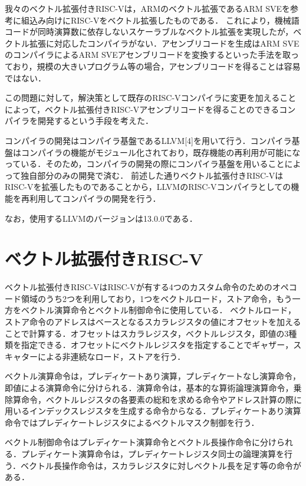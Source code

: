 \documentclass[a4paper,9pt, twocolumn]{jarticle}
\begin{document}
我々のベクトル拡張付きRISC-Vは，ARMのベクトル拡張であるARM SVE\cite{bib:arm_sve}を参考に組込み向けにRISC-V\cite{bib:risc-v}をベクトル拡張したものである．
これにより，機械語コードが同時演算数に依存しないスケーラブルなベクトル拡張を実現したが，ベクトル拡張に対応したコンパイラがない．アセンブリコードを生成はARM SVEのコンパイラによるARM SVEアセンブリコードを変換するといった手法を取っており，規模の大きいプログラム等の場合，アセンブリコードを得ることは容易ではない．

この問題に対して，解決策として既存のRISC-Vコンパイラに変更を加えることによって，ベクトル拡張付きRISC-Vアセンブリコードを得ることのできるコンパイラを開発するという手段を考えた．

コンパイラの開発はコンパイラ基盤であるLLVM[4]を用いて行う．コンパイラ基盤はコンパイラの機能がモジュール化されており，既存機能の再利用が可能になっている．そのため，コンパイラの開発の際にコンパイラ基盤を用いることによって独自部分のみの開発で済む．
前述した通りベクトル拡張付きRISC-VはRISC-Vを拡張したものであることから，LLVMのRISC-Vコンパイラとしての機能を再利用してコンパイラの開発を行う．

なお，使用するLLVMのバージョンは13.0.0である．

\section{ベクトル拡張付きRISC-V}

ベクトル拡張付きRISC-VはRISC-Vが有する4つのカスタム命令のためのオペコード領域のうち2つを利用しており，1つをベクトルロード，ストア命令，もう一方をベクトル演算命令とベクトル制御命令に使用している．
ベクトルロード，ストア命令のアドレスはベースとなるスカラレジスタの値にオフセットを加えることで計算する．オフセットはスカラレジスタ，ベクトルレジスタ，即値の3種類を指定できる．オフセットにベクトルレジスタを指定することでギャザー，スキャターによる非連続なロード，ストアを行う．

ベクトル演算命令は，プレディケートあり演算，プレディケートなし演算命令，即値による演算命令に分けられる．演算命令は，基本的な算術論理演算命令，乗除算命令，ベクトルレジスタの各要素の総和を求める命令やアドレス計算の際に用いるインデックスレジスタを生成する命令からなる．プレディケートあり演算命令ではプレディケートレジスタによるベクトルマスク制御を行う．

ベクトル制御命令はプレディケート演算命令とベクトル長操作命令に分けられる．プレディケート演算命令は，プレディケートレジスタ同士の論理演算を行う．ベクトル長操作命令は，スカラレジスタに対しベクトル長を足す等の命令がある．
\end{document}
